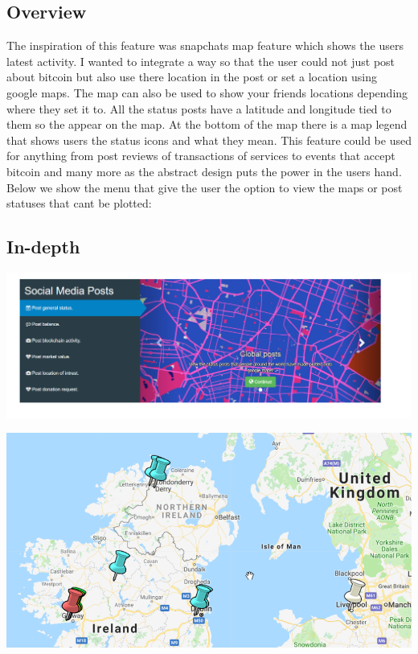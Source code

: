 \subsection{Overview}
The inspiration of this feature was snapchats map feature which shows the users latest activity. I wanted to integrate a way so that the user could not just post about bitcoin but also use there location in the post or set a location using google maps. The map can also be used to show your friends locations depending where they set it to. All the status posts have a latitude and longitude tied to them so the appear on the map. At the bottom of the map there is a map legend that shows users the status icons and what they mean. This feature could be used for anything from post reviews of transactions of services to events that accept bitcoin and many more as the abstract design puts the power in the users hand. Below we show the menu that give the user the option to view the maps or post statuses that cant be plotted:

\subsection{In-depth}

\includegraphics[]{img/mapmenu.png}

\includegraphics[]{img/map1.png}

